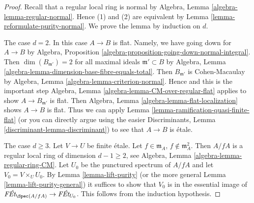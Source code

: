 \begin{proof}
Recall that a regular local ring is normal by
Algebra, Lemma \ref{algebra-lemma-regular-normal}.
Hence (1) and (2) are equivalent by
Lemma \ref{lemma-reformulate-purity-normal}.
We prove the lemma by induction on $d$.

\medskip\noindent
The case $d = 2$. In this case $A \to B$ is flat.
Namely, we have going down for $A \to B$ by
Algebra, Proposition \ref{algebra-proposition-going-down-normal-integral}.
Then $\dim(B_{\mathfrak m'}) = 2$ for all maximal ideals
$\mathfrak m' \subset B$ by
Algebra, Lemma \ref{algebra-lemma-dimension-base-fibre-equals-total}.
Then $B_{\mathfrak m'}$ is Cohen-Macaulay by
Algebra, Lemma \ref{algebra-lemma-criterion-normal}.
Hence and this is the important step
Algebra, Lemma \ref{algebra-lemma-CM-over-regular-flat}
applies to show $A \to B_{\mathfrak m'}$ is flat.
Then Algebra, Lemma \ref{algebra-lemma-flat-localization}
shows $A \to B$ is flat. Thus we can apply
Lemma \ref{lemma-ramification-quasi-finite-flat}
(or you can directly argue using the easier
Discriminants, Lemma \ref{discriminant-lemma-discriminant})
to see that $A \to B$ is \'etale.

\medskip\noindent
The case $d \geq 3$. Let $V \to U$ be finite \'etale.
Let $f \in \mathfrak m_A$, $f \not \in \mathfrak m_A^2$.
Then $A/fA$ is a regular local ring of dimension $d - 1 \geq 2$, see
Algebra, Lemma \ref{algebra-lemma-regular-ring-CM}.
Let $U_0$ be the punctured spectrum of $A/fA$ and let
$V_0 = V \times_U U_0$.
By Lemma \ref{lemma-lift-purity} (or the more general
Lemma \ref{lemma-lift-purity-general})
it suffices to show that $V_0$ is in the essential
image of $\textit{F\'Et}_{\Spec(A/fA)} \to \textit{F\'Et}_{U_0}$.
This follows from the induction hypothesis.
\end{proof}

